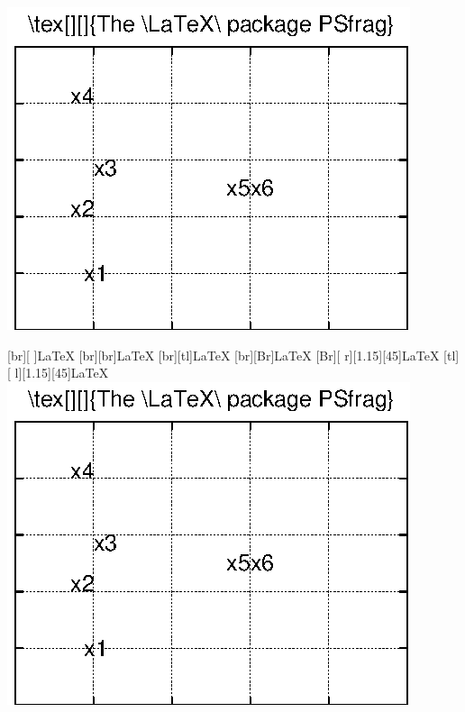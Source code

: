 \documentclass[12pt]{article}
\begin{document}
\includegraphics[width=.47\textwidth]{psf-demo}
\hfill
\begin{psfrags}
  \psfragscanon
  [br][  ]{\LaTeX} [br][br]{\LaTeX}
  [br][tl]{\LaTeX} [br][Br]{\LaTeX}
  [Br][ r][1.15][45]{\Huge\LaTeX}
  [tl][ l][1.15][45]{\Huge\LaTeX}
  \includegraphics[width=.47\textwidth]{psf-demo}
\end{psfrags}
\end{document}
